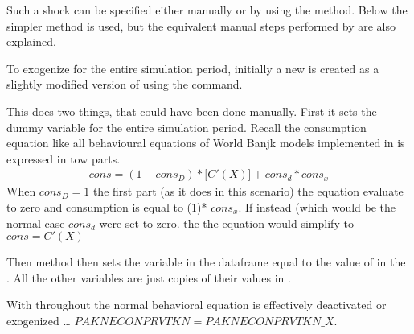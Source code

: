 \documentclass[letterpaper,10pt,english]{jupyterBook}
\begin{document}
\sphinxAtStartPar
Such a shock can be specified either manually or by using the method. Below the simpler  method is used, but the equivalent manual steps performed by  are also explained.

\sphinxAtStartPar
To exogenize  for the entire simulation period, initially a new   is created as a slightly modified version of   using the  command.

\sphinxAtStartPar
{}

\sphinxAtStartPar
This does two things, that could have been done manually.  First it sets the dummy variable  for the entire simulation period. Recall the consumption equation like all behavioural equations of World Banjk models implemented in is expressed in tow parts.
\begin{equation*}
\begin{split} cons= (1-cons_D)*\bigg[C'(X)\bigg] + cons_d*cons_x\end{split}
\end{equation*}
\sphinxAtStartPar
When \(cons_D=1\) the first part (as it does in this scenario) the equation evaluate to zero and consumption is equal to (1)* \(cons_x\).  If instead (which would be the normal case \(cons_d\) were set to zero. the the equation would simplify to \( cons= C'(X) \)

\sphinxAtStartPar
Then  method then sets the variable  in the  dataframe equal to the value of  in the  . All the other variables are  just copies of their values in .

\sphinxAtStartPar
With  throughout the normal behavioral equation is effectively de\sphinxhyphen{}activated or exogenized … \(PAKNECONPRVTKN=PAKNECONPRVTKN\_X\).
\end{document}
